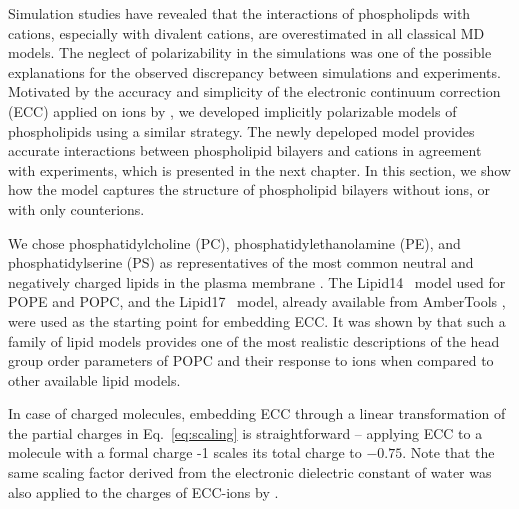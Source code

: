 Simulation studies have revealed that the interactions of phospholipds with cations, especially with divalent cations, 
are overestimated in all classical MD models. \citep{catte16}
The neglect of polarizability in the simulations was one of the possible explanations for the observed discrepancy between simulations and experiments. 
Motivated by the accuracy and simplicity of the electronic continuum correction (ECC) applied on ions by \citep{martinek17},
we developed implicitly polarizable models of phospholipids using a similar strategy. 
The newly depeloped model provides accurate interactions between phospholipid bilayers and cations in agreement with experiments, 
which is presented in the next chapter.  
In this section, we show how the model captures the structure of phospholipid bilayers without ions, or with only counterions. 

We chose phosphatidylcholine (PC), phosphatidylethanolamine (PE), and phosphatidylserine (PS)
as representatives of the most common neutral and negatively charged lipids in the plasma membrane \citep{kroon2011_lipid_map, marsh13}. 
The Lipid14~\citep{dickson14} model used for POPE and POPC,
and the Lipid17~\citep{lipid17-future} model, already available from AmberTools \citep{ferrer13},
were used as the starting point for embedding ECC.
It was shown by \citet{botan15, catte16} that such a family of lipid models provides one of the most 
realistic descriptions of the head group order parameters of POPC and their response to ions 
when compared to other available lipid models. 

In case of charged molecules, 
embedding ECC through a linear transformation of the partial charges in Eq.~\ref{eq:scaling} is straightforward -- 
applying ECC to a molecule with a formal charge -1 scales its total charge to $-0.75$. 
Note that the same scaling factor derived from the electronic dielectric constant of water 
was also applied to the charges of ECC-ions by \citet{Pluharova2014, kohagen14, kohagen16, martinek17}.

